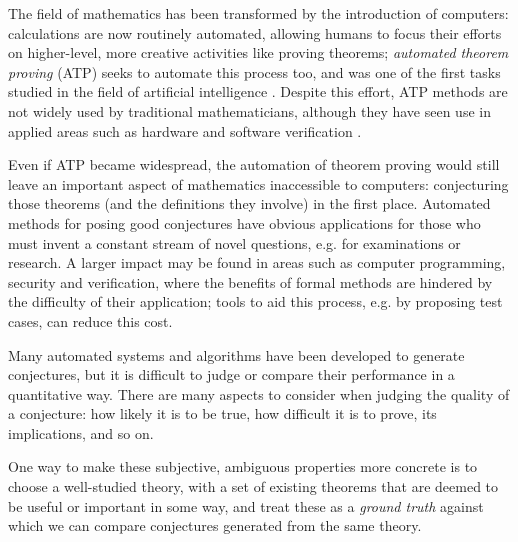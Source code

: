 


The field of mathematics has been transformed by the introduction of computers:
calculations are now routinely automated, allowing humans to focus their efforts
on higher-level, more creative activities like proving theorems; \emph{automated
theorem proving} (ATP) seeks to automate this process too, and was one of the
first tasks studied in the field of artificial intelligence
\cite{newell1956logic,sutcliffe2001evaluating}. Despite this effort, ATP
methods are not widely used by traditional mathematicians, although they have
seen use in applied areas such as hardware and software verification
\cite{Moore:2003}.


Even if ATP became widespread, the automation of theorem proving would still
leave an important aspect of mathematics inaccessible to computers: conjecturing
those theorems (and the definitions they involve) in the first place. Automated
methods for posing good conjectures have obvious applications for those who must
invent a constant stream of novel questions, e.g. for examinations or research.
A larger impact may be found in areas such as computer programming, security and
verification, where the benefits of formal methods are hindered by the
difficulty of their application; tools to aid this process, e.g. by proposing
test cases, can reduce this cost.

Many automated systems and algorithms have been developed to generate
conjectures, but it is difficult to judge or compare their performance in a
quantitative way. There are many aspects to consider when judging the quality of
a conjecture: how likely it is to be true, how difficult it is to prove, its
implications, and so on.

One way to make these subjective, ambiguous properties more concrete is to
choose a well-studied theory, with a set of existing theorems that are deemed to
be useful or important in some way, and treat these as a \emph{ground truth}
against which we can compare conjectures generated from the same theory.

